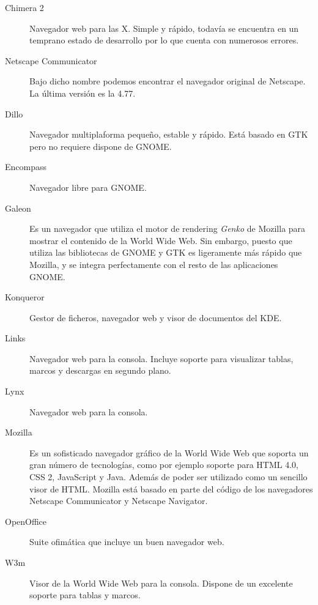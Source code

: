 \begin{description}

\item[Chimera  2] Navegador  web para  las {\sf  X}. Simple  y rápido,
todavía se  encuentra en un temprano  estado de desarrollo por  lo que
cuenta con numerosos errores.

\item[Netscape Communicator]  Bajo dicho  nombre podemos  encontrar el
navegador original de {\sf Netscape}. La última versión es la 4.77.

\item[Dillo] Navegador  multiplaforma pequeño, estable y  rápido. Está
basado en {\sf GTK} pero no requiere dispone de {\sf GNOME}.

\item[Encompass] Navegador libre para {\sf GNOME}.

\item[Galeon] Es un  navegador que utiliza el motor  de rendering {\em
Genko} de  {\sf Mozilla} para  mostrar el  contenido de la  World Wide
Web. Sin embargo, puesto que utiliza  las bibliotecas de {\sf GNOME} y
{\sf GTK}  es ligeramente más rápido  que {\sf Mozilla}, y  se integra
perfectamente con el resto de las aplicaciones {\sf GNOME}.

\item[Konqueror]  Gestor  de  ficheros,   navegador  web  y  visor  de
documentos del {\sf KDE}.

\item[Links]  Navegador  web para  la  consola.  Incluye soporte  para
visualizar tablas, marcos y descargas en segundo plano.

\item[Lynx] Navegador web para la consola.

\item[Mozilla] Es  un sofisticado navegador  gráfico de la  World Wide
Web  que soporta  un  gran  número de  tecnologías,  como por  ejemplo
soporte para HTML 4.0, CSS 2, {\sf JavaScript} y {\sf Java}. Además de
poder  ser utilizado  como un  sencillo visor  de HTML.  {\sf Mozilla}
está  basado en  parte del  código  de los  navegadores {\sf  Netscape
Communicator} y {\sf Netscape Navigator}.

\item[OpenOffice] Suite ofimática que incluye un buen navegador web.

\item[W3m] Visor de  la World Wide Web para la  consola. Dispone de un
excelente soporte para tablas y marcos.

\end{description}

